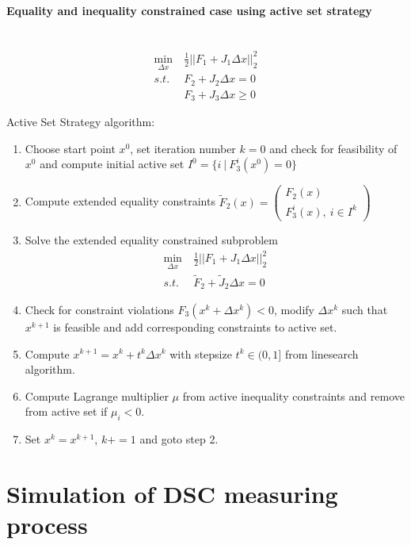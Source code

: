 \documentclass{scrartcl}[12pt, halfparskip]
\begin{document}
\paragraph{Equality and inequality constrained case using active set strategy}\mbox{}\\
\begin{align}
\min_{\Delta x} & \ \frac{1}{2} || F_1 + J_1 \Delta x ||_2^2 \label{eq:numerical_soln_ineq_constrained_LSQ} \\
s.t. & \ F_2 + J_2 \Delta x = 0 \nonumber \\
&  \ F_3 + J_3 \Delta x \ge 0 \nonumber
\end{align}

Active Set Strategy algorithm:
\begin{enumerate}
	\item Choose start point $x^0$, set iteration number $k=0$ and check for feasibility of $x^0$ and compute  initial active set $I^0 = \{ i \ | \ F_3^i(x^0) = 0 \}$
	\item Compute extended equality constraints $\tilde{F}_2(x) = 
	\begin{pmatrix} 
	F_2(x) \\  
	F_3^i(x), \ i \in I^k
	\end{pmatrix}$
	\item Solve the extended equality constrained subproblem
	\begin{align}
		\min_{\Delta x} & \ \frac{1}{2} || F_1 + J_1 \Delta x ||_2^2 \nonumber \\
		s.t. & \ \tilde{F}_2 + \tilde{J}_2 \Delta x = 0 \nonumber
	\end{align}
	\item Check for constraint violations $F_3(x^k + \Delta x^k) < 0$, modify $\Delta x^k$ such that $x^{k+1}$ is feasible and add corresponding constraints to active set.
	\item Compute $x^{k+1} = x^k + t^k \Delta x^k$ with stepsize $t^k \in (0, 1]$ from linesearch algorithm.
	\item Compute Lagrange multiplier $\mu$ from active inequality constraints and remove from active set if $\mu_i < 0$.
	\item Set $x^k = x^{k+1}$, $k += 1$ and goto step 2.
\end{enumerate}



\newpage
\section{Simulation of DSC measuring process}
\end{document}
